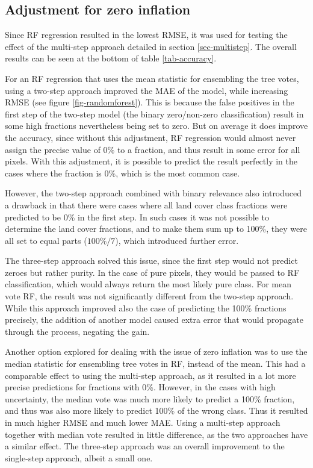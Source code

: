\documentclass[review,authoryear,3p]{elsarticle}
\begin{document}
\subsection{Adjustment for zero inflation}

Since \gls{RF} regression resulted in the lowest RMSE, it was used for testing the effect of the multi-step approach detailed in section \ref{sec-multistep}.
The overall results can be seen at the bottom of table \ref{tab-accuracy}.

For an \gls{RF} regression that uses the mean statistic for ensembling the tree votes, using a two-step approach improved the \gls{MAE} of the model, while increasing \gls{RMSE} (see figure \ref{fig-randomforest}).
This is because the false positives in the first step of the two-step model (the binary zero/non-zero classification) result in some high fractions nevertheless being set to zero.
But on average it does improve the accuracy, since without this adjustment, \gls{RF} regression would almost never assign the precise value of 0\% to a fraction, and thus result in some error for all pixels.
With this adjustment, it is possible to predict the result perfectly in the cases where the fraction is 0\%, which is the most common case.

However, the two-step approach combined with binary relevance also introduced a drawback in that there were cases where all land cover class fractions were predicted to be 0\% in the first step.
In such cases it was not possible to determine the land cover fractions, and to make them sum up to 100\%, they were all set to equal parts ($100\% / 7$), which introduced further error.

The three-step approach solved this issue, since the first step would not predict zeroes but rather purity.
In the case of pure pixels, they would be passed to \gls{RF} classification, which would always return the most likely pure class.
For mean vote \gls{RF}, the result was not significantly different from the two-step approach.
While this approach improved also the case of predicting the 100\% fractions precisely, the addition of another model caused extra error that would propagate through the process, negating the gain.

Another option explored for dealing with the issue of zero inflation was to use the median statistic for ensembling tree votes in \gls{RF}, instead of the mean.
This had a comparable effect to using the multi-step approach, as it resulted in a lot more precise predictions for fractions with 0\%.
However, in the cases with high uncertainty, the median vote was much more likely to predict a 100\% fraction, and thus was also more likely to predict 100\% of the wrong class.
Thus it resulted in much higher \gls{RMSE} and much lower \gls{MAE}.
Using a multi-step approach together with median vote resulted in little difference, as the two approaches have a similar effect.
The three-step approach was an overall improvement to the single-step approach, albeit a small one.
\end{document}
